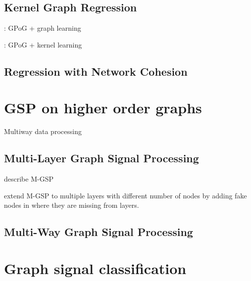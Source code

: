\cite{Takeda2007}

\cite{Elias2022}

\cite{Venkitaraman2019}


\subsection{Kernel Graph Regression}

\cite{Venkitaraman2020}

\cite{Miao2022}: GPoG + graph learning

\cite{Zhi2023}: GPoG + kernel learning

\cite{Elias2022}

\subsection{Regression with Network Cohesion}

\cite{Le2022}

\cite{Li2019}

\section{GSP on higher order graphs}

Multiway data processing 

\cite{Smilde2004}
\cite{Kroonenberg2008}


\cite{Ji2019}

\cite{Cammoun2009}


\subsection{Multi-Layer Graph Signal Processing}

\cite{Zhang2022} describe M-GSP 

\cite{Zhang2018} extend M-GSP to multiple layers with different number of nodes by adding fake nodes in where they are missing from layers. 
 

\subsection{Multi-Way Graph Signal Processing}


\cite{Zhao2023}

\cite{Li2012}



\section{Graph signal classification}

